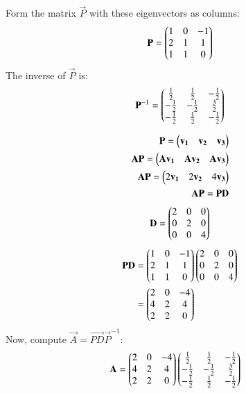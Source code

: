 \documentclass[journal]{IEEEtran}
\begin{document}
Form the matrix $\vec{P}$ with these eigenvectors as columns:
\begin{align}
\mathbf{P} = \begin{pmatrix}
1 & 0 & -1 \\
2 & 1 & 1 \\
1 & 1 & 0
\end{pmatrix}
\end{align}
The inverse of $\vec{P}$ is:
\begin{align}
\mathbf{P}^{-1} = 
\begin{pmatrix}
\frac{1}{2} & \frac{1}{2} & -\frac{1}{2} \\
-\frac{1}{2} & -\frac{1}{2} & \frac{3}{2} \\
-\frac{1}{2} & \frac{1}{2} & -\frac{1}{2}
\end{pmatrix}
\end{align}

\begin{align}
\mathbf{P}=\begin{pmatrix}\mathbf{v_1}&\mathbf{v_2}&\mathbf{v_3}\end{pmatrix}\\
\mathbf{A}\mathbf{P}=\begin{pmatrix}\mathbf{A}\mathbf{v_1}&\mathbf{A}\mathbf{v_2}&\mathbf{A}\mathbf{v_3}\end{pmatrix}\\
\mathbf{A}\mathbf{P}=\begin{pmatrix}2\mathbf{v_1}&2\mathbf{v_2}&4\mathbf{v_3}\end{pmatrix}\\
\mathbf{A}\mathbf{P}=\mathbf{P}\mathbf{D}
\end{align}
\begin{align}
\mathbf{D}=
\begin{pmatrix}
2 & 0 & 0 \\
0 & 2 & 0 \\
0 & 0 & 4
\end{pmatrix}
\end{align}
\begin{align}
\mathbf{PD} &= \begin{pmatrix}
1 & 0 & -1 \\
2 & 1 & 1 \\
1 & 1 & 0
\end{pmatrix}
\begin{pmatrix}
2 & 0 & 0 \\
0 & 2 & 0 \\
0 & 0 & 4
\end{pmatrix} \\
&= \begin{pmatrix}
2 & 0 & -4 \\
4 & 2 & 4 \\
2 & 2 & 0
\end{pmatrix}
\end{align}
Now, compute $\vec{A} = \vec{PD}\vec{P}^{-1}$:
\begin{align}
\mathbf{A} &= \begin{pmatrix}
2 & 0 & -4 \\
4 & 2 & 4 \\
2 & 2 & 0
\end{pmatrix}
\begin{pmatrix}
\frac{1}{2} & \frac{1}{2} & -\frac{1}{2} \\
-\frac{1}{2} & -\frac{1}{2} & \frac{3}{2} \\
-\frac{1}{2} & \frac{1}{2} & -\frac{1}{2}
\end{pmatrix}
\end{align}
\end{document}
